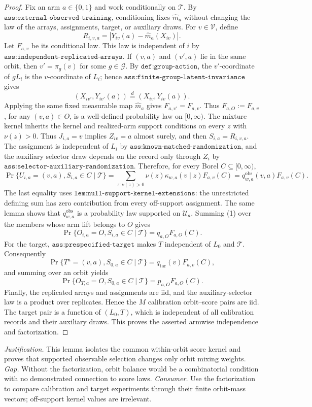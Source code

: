 \documentclass{article}
\begin{document}
\begin{proof}
Fix an arm \(a\in\{0,1\}\) and work conditionally on \(\mathcal T\). By \(\texttt{ass:external-observed-training}\), conditioning fixes \(\widehat m_a\) without changing the law of the arrays, assignments, target, or auxiliary draws. For \(v\in\mathcal V\), define \[R_{i,v,a}=|Y_{iv}(a)-\widehat m_a(X_{iv})|.\] Let \(F_{a,v}\) be its conditional law. This law is independent of \(i\) by \(\texttt{ass:independent-replicated-arrays}\). If \((v,a)\) and \((v',a)\) lie in the same orbit, then \(v'=\pi_g(v)\) for some \(g\in\mathcal G\). By \(\texttt{def:group-action}\), the \(v'\)-coordinate of \(gL_i\) is the \(v\)-coordinate of \(L_i\); hence \(\texttt{ass:finite-group-latent-invariance}\) gives \[(X_{iv'},Y_{iv'}(a))\stackrel{d}{=}(X_{iv},Y_{iv}(a)).\] Applying the same fixed measurable map \(\widehat m_a\) gives \(F_{a,v'}=F_{a,v}\). Thus \(F_{a,O}:=F_{a,v}\), for any \((v,a)\in O\), is a well-defined probability law on \([0,\infty)\).
The mixture kernel inherits the kernel and realized-arm support conditions on every \(z\) with \(\nu(z)>0\). Thus \(J_{i,a}=v\) implies \(Z_{iv}=a\) almost surely, and then \(S_{i,a}=R_{i,v,a}\). The assignment is independent of \(L_i\) by \(\texttt{ass:known-matched-randomization}\), and the auxiliary selector draw depends on the record only through \(Z_i\) by \(\texttt{ass:selector-auxiliary-randomization}\). Therefore, for every Borel \(C\subseteq[0,\infty)\), \[\Pr\{U_{i,a}=(v,a),S_{i,a}\in C\mid\mathcal T\}=\sum_{z:\nu(z)>0}\nu(z)\kappa_{w,a}(v\mid z)F_{a,v}(C)=q^{\mathrm{obs}}_{w,a}(v,a)F_{a,v}(C).\tag{1}\] The last equality uses \(\texttt{lem:null-support-kernel-extensions}\): the unrestricted defining sum has zero contribution from every off-support assignment. The same lemma shows that \(q^{\mathrm{obs}}_{w,a}\) is a probability law supported on \(\mathcal U_a\). Summing (1) over the members whose arm lift belongs to \(O\) gives \[\Pr\{O_{i,a}=O,S_{i,a}\in C\mid\mathcal T\}=q_{a,O}F_{a,O}(C).\tag{2}\]
For the target, \(\texttt{ass:prespecified-target}\) makes \(T\) independent of \(L_0\) and \(\mathcal T\). Consequently \[\Pr\{T^a=(v,a),S_{0,a}\in C\mid\mathcal T\}=q_{\mathrm{tar}}(v)F_{a,v}(C),\] and summing over an orbit yields \[\Pr\{O_{T,a}=O,S_{0,a}\in C\mid\mathcal T\}=p_{a,O}F_{a,O}(C).\tag{3}\] Finally, the replicated arrays and assignments are iid, and the auxiliary-selector law is a product over replicates. Hence the \(M\) calibration orbit--score pairs are iid. The target pair is a function of \((L_0,T)\), which is independent of all calibration records and their auxiliary draws. This proves the asserted armwise independence and factorization.
\end{proof}
\par\smallskip\noindent \textit{Justification.} This lemma isolates the common within-orbit score kernel and proves that supported observable selection changes only orbit mixing weights. \textit{Gap.} Without the factorization, orbit balance would be a combinatorial condition with no demonstrated connection to score laws. \textit{Consumer.} Use the factorization to compare calibration and target experiments through their finite orbit-mass vectors; off-support kernel values are irrelevant.
\end{document}
